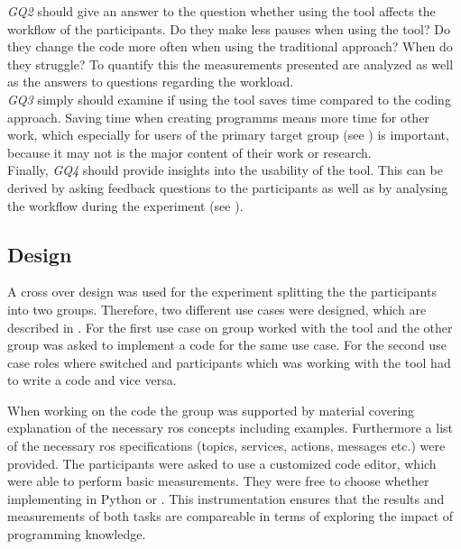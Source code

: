 \textit{GQ2} should give an answer to the question whether using the tool affects the workflow of the participants. Do they make less pauses when using the tool? Do they change the code more often when using the traditional approach? When do they struggle? To quantify this the measurements presented  are analyzed as well as the answers to questions regarding the workload. \\

\textit{GQ3} simply should examine if using the tool saves time compared to the coding approach. Saving time when creating programms means more time for other work, which especially for users of the primary target group (see ) is important, because it may not is the major content of their work or research. \\

Finally, \textit{GQ4} should provide insights into the usability of the tool. This can be derived by asking feedback questions to the participants as well as by analysing the workflow during the experiment (see ).


\subsection{Design} \label{sub:ExprimentDesign}
A cross over design was used for the experiment splitting the the participants into two groups. Therefore, two different use cases were designed, which are described in . For the first use case on group worked with the tool and the other group was asked to implement a code for the same use case. For the second use case roles where switched and participants which was working with the tool had to write a code and vice versa.

When working on the code the group was supported by material covering explanation of the necessary \gls{ros} concepts including examples. Furthermore a list of the necessary \gls{ros} specifications (topics, services, actions, messages etc.) were provided. The participants were asked to use a customized code editor, which were able to perform basic measurements. They were free to choose whether implementing in Python or \Cpp{}. This instrumentation ensures that the results and measurements of both tasks are compareable in terms of exploring the impact of programming knowledge.

